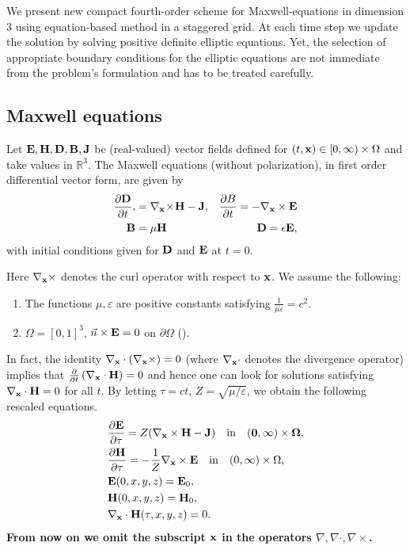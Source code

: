 \documentclass[12pt,reqno]{amsart}
\newcommand{\R}{\mathbb{R}}
\newcommand{\e}{{\bf E}}
\newcommand{\h}{{\bf H}}
\theoremstyle{definition}
\numberwithin{equation}{section}
\begin{document}
	We present new compact fourth-order scheme for Maxwell-equations in dimension $3$ using equation-based method in a staggered grid.
	At each time step we update the solution by solving positive definite   elliptic equations. Yet, the selection of appropriate boundary conditions for the elliptic equations are not immediate from the problem's formulation and has to be treated carefully.

	
	\subsection{Maxwell equations}
	Let $\e,\h,\bf{D},\bf{B},\bf{J}$ be (real-valued) vector fields defined for   $(t,{\bf x})\in [0,\infty)\times\Omega$ and take values in $\R^3$.
	The Maxwell equations (without polarization), in first order differential vector form, are given by
	\begin{align*}
		\frac{\partial \bf{D}}{\partial t}, &= \nabla_{{\bf x}} \!\times\! \bf{H} - \bf{J}, &
		\frac{\partial B}{\partial t}=-\nabla_{{\bf x}}\times \e &\\
		\bf{B} &= \mu \bf{H} & \bf{D} = \epsilon \bf{E},
	\end{align*}
	with initial conditions given for $\bf{D}$ and $\bf{E}$ at $t=0$.

Here $\nabla_{{\bf x}} \times $ denotes the curl operator with respect to ${\bf x}$.
We assume the following:
\begin{enumerate}
	\item  The functions $\mu,\varepsilon$ are    positive constants satisfying $\frac{1}{\mu \varepsilon}=c^2$.
	\item  $\Omega=[0,1]^3$, $\vec{n} \times {\bf E}=0$ on $\partial \Omega$ (\cite[Section 8]{rolf}).
\end{enumerate}
In fact, the identity $\nabla_{{\bf x}}\cdot (\nabla_{{\bf x}}\times)=0$ (where $\nabla_{{\bf x}} \cdot$ denotes the divergence operator) implies that 
$\frac{\partial}{\partial t}\left (\nabla_{{\bf x}} \cdot \h\right)=0$ and hence 
one can look for solutions  satisfying $\nabla_{{\bf x}}\cdot \h=0$ for all $t$.
By letting  $ \tau=ct$,  $Z=\sqrt{\mu/\varepsilon}$, we obtain the following rescaled equations.
	\begin{align}
	\label{eq:maxwellv}
	&\notag
\frac{\partial {\bf E}}{\partial \tau }=Z(\nabla_{{\bf x}} \times \bf{H}-{\bf J}) \quad \mathrm{in} \quad  (0,\infty)\times \Omega,\\&\notag
 \frac{\partial {\bf H}}{\partial \tau }=-\frac{1}{Z}\nabla_{{\bf x}} \times \e \quad \mathrm{in} \quad  (0,\infty)\times \Omega,\\&\notag
 \e(0,x,y,z)=\e_0, \\&
  \h(0,x,y,z)=\h_0,\\&\notag
	\nabla_{{\bf x}}\cdot \h(\tau,x,y,z) = 0.\notag
\end{align}
{\bf From now on we omit the subscript ${{\bf x}}$ in the operators 
$\nabla, \nabla\cdot , \nabla \times$.}
\end{document}
